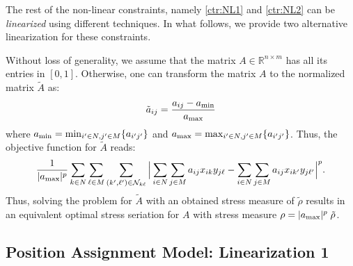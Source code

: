 \documentclass[a4paper,11pt, reqno]{amsart}
\def\N{\mathcal{N}}
\def\R{\mathbb{R}}
\begin{document}
The rest of the non-linear constraints, namely \eqref{ctr:NL1} and \eqref{ctr:NL2} can be \emph{linearized} using different techniques. In what follows, we provide two alternative linearization for these constraints.


Without loss of generality, we assume that the matrix $A \in \R^{n\times m}$ has all its entries in $[0,1]$. Otherwise, one can transform the matrix $A$ to the normalized matrix $\tilde{A}$ as:
$$
\tilde{a}_{ij} = \frac{a_{ij} - a_{\rm min}}{a_{\rm max}}
$$
where $a_{\rm min} = \min_{i'\in N, j'\in M} \{a_{i'j'}\}$ and $a_{\rm max} = \max_{i'\in N, j'\in M} \{a_{i'j'}\}$. Thus, the objective function for $\tilde{A}$ reads:
$$
 \frac{1}{|a_{\rm max}|^p}\sum_{k\in N}\sum_{\ell \in M} \sum_{(k',\ell ') \in \mathcal{N}_{k\ell}} 
    \Big|\sum_{i\in N}\sum_{j\in M} a_{ij}x_{ik} y_{j\ell} -
         \sum_{i\in N}\sum_{j\in M} a_{ij}x_{ik'}y_{j\ell '} \Big|^p.
$$
Thus, solving the problem for $\tilde{A}$ with an obtained stress measure of $\tilde{\rho}$ results in an equivalent optimal stress seriation for $A$ with stress measure $\rho = |a_{\rm max}|^p \; \tilde{\rho}$.


\subsection{Position Assignment Model: Linearization 1}

\end{document}
